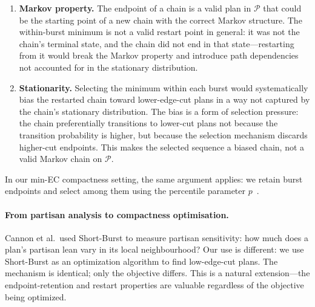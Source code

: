 \begin{enumerate}
\item \textbf{Markov property.}
      The endpoint of a \recom{} chain is a valid plan in $\mathcal{P}$
      that could be the starting point of a new chain with the correct
      Markov structure.
      The within-burst minimum is not a valid restart point in general:
      it was not the chain's terminal state, and the chain did not end
      in that state---restarting from it would break the Markov property
      and introduce path dependencies not accounted for in the stationary
      distribution.

\item \textbf{Stationarity.}
      Selecting the minimum within each burst would systematically bias
      the restarted chain toward lower-edge-cut plans in a way not captured
      by the chain's stationary distribution.
      The bias is a form of selection pressure: the chain preferentially
      transitions to lower-cut plans not because the transition probability
      is higher, but because the selection mechanism discards higher-cut endpoints.
      This makes the selected sequence a biased chain, not a valid
      Markov chain on $\mathcal{P}$.
\end{enumerate}

In our min-EC compactness setting, the same argument applies: we retain
burst endpoints and select among them using the percentile parameter $p$~\citep{h0paper}.

\paragraph{From partisan analysis to compactness optimisation.}

Cannon et al.\ used Short-Burst to measure partisan sensitivity: how
much does a plan's partisan lean vary in its local neighbourhood?
Our use is different: we use Short-Burst as an optimization algorithm
to find low-edge-cut plans.
The mechanism is identical; only the objective differs.
This is a natural extension---the endpoint-retention and restart properties
are valuable regardless of the objective being optimized.
